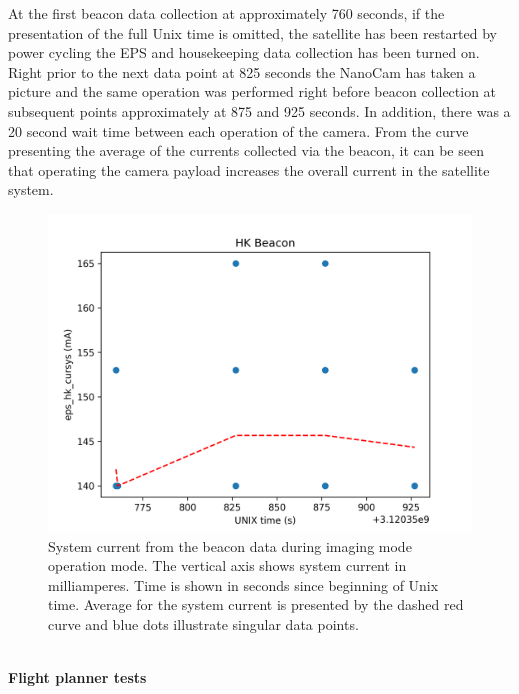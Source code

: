 \documentclass[english,12pt,a4paper,pdftex,elec,utf8]{aaltothesis}
\begin{document}
At the first beacon data collection at approximately 760 seconds, if the presentation of the full Unix time is omitted, the satellite has been restarted by power cycling the EPS and housekeeping data collection has been turned on. Right prior to the next data point at 825 seconds the NanoCam has taken a picture and the same operation was performed right before beacon collection at subsequent points approximately at 875 and 925 seconds. In addition, there was a 20 second wait time between each operation of the camera. From the curve presenting the average of the currents collected via the beacon, it can be seen that operating the camera payload increases the overall current in the satellite system.
\\
\begin{figure}[h!]
\centering
\includegraphics[scale=0.7]{hk_plot_cam_op2_mod}
\caption{System current from the beacon data during imaging mode operation mode. The vertical axis shows system current in milliamperes. Time is shown in seconds since beginning of Unix time. Average for the system current is presented by the dashed red curve and blue dots illustrate singular data points.}
\label{hkcamplotjoo}
\end{figure}
\\
\textbf{Flight planner tests}
\\ 
\end{document}
